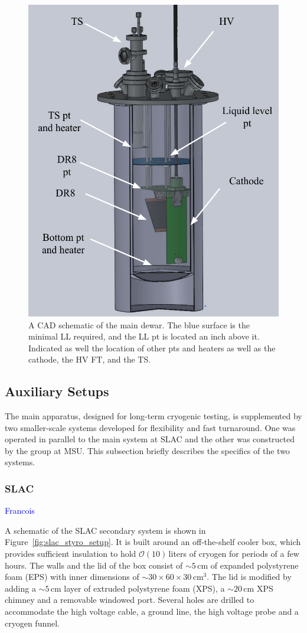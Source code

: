 \documentclass[a4paper,12pt]{article}
\begin{document}
\begin{figure}[ht]
\centerline{\includegraphics[width=0.75\linewidth]{Dewar.png}}

\caption{A CAD schematic of the main dewar. The blue surface is the minimal LL required, and the LL pt is located an inch above it. Indicated as well the location of other pts and heaters as well as the cathode, the HV FT, and the TS.}
\label{fig:mainDewar}
\end{figure}



\subsection{Auxiliary Setups}
\label{sec:auxsetup}
The main apparatus, designed for long-term cryogenic testing, is supplemented by two smaller-scale systems developed for flexibility and fast turnaround. One was operated in parallel to the main system at SLAC and the other was constructed by the group at MSU. This subsection briefly describes the specifics of the two systems.

\subsubsection{SLAC}
\label{sec:beerBox}
\textcolor{blue}{Francois}

A schematic of the SLAC secondary system is shown in Figure~\ref{fig:slac_styro_setup}. It is built around an off-the-shelf cooler box, which provides sufficient insulation to hold $\mathcal{O}(10)$\,liters of cryogen for periods of a few hours. The walls and the lid of the box consist of $\sim5$\,cm of expanded polystyrene foam (EPS) with inner dimensions of $\sim30\times60\times30$\,cm$^3$. The lid is modified by adding a $\sim5$\,cm layer of extruded polystyrene foam (XPS), a $\sim20$\,cm XPS chimney and a removable windowed port. Several holes are drilled to accommodate the high voltage cable, a ground line, the high voltage probe and a cryogen funnel.
\end{document}
